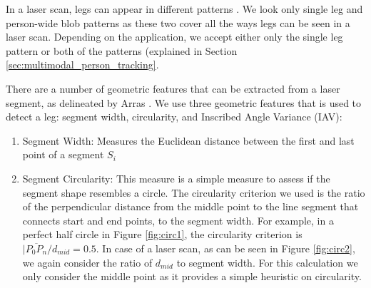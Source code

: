 In a laser scan, legs can appear in different patterns \cite{topp2005tracking}. We look only single leg and person-wide blob patterns as these two cover all the ways legs can be seen in a laser scan. Depending on the application, we accept either only the single leg pattern or both of the patterns (explained in Section \ref{sec:multimodal_person_tracking}.

There are a number of geometric features that can be extracted from a laser segment, as delineated by Arras \cite{arras2007using}. We use three geometric features that is used to detect a leg: segment width, circularity, and Inscribed Angle Variance (IAV):


\begin{enumerate}
\item Segment Width: Measures the Euclidean distance between the first and last point of a segment $S_i$




\item Segment Circularity: This measure is a simple measure to assess if the segment shape resembles a circle. The circularity criterion we used is the ratio of the perpendicular distance from the middle point to the line segment that connects start and end points, to the segment width. For example, in a perfect half circle in Figure \ref{fig:circ1}, the circularity criterion is $|\overline{P_0P_n}/d_{mid}=0.5$. In case of a laser scan, as can be seen in Figure \ref{fig:circ2}, we again consider the ratio of $d_{mid}$ to segment width. For this calculation we only consider the middle point as it provides a simple heuristic on circularity.


\end{enumerate}

